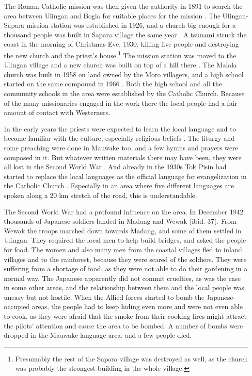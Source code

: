 The Roman Catholic mission was then given the authority in 1891 to search the area between Ulingan and Bogia for suitable places for the mission \citep[8]{Duamba1996}.  The Ulingan-Sapara mission station was established in 1926, and a church big enough for a thousand people was built in Sapara village the same year \citep[21]{BrummEtAl1995}%
.  A tsunami struck the coast in the morning of Christmas Eve, 1930, killing five people and destroying the new church and the priest's house.\footnote{Presumably the rest of the Sapara village was destroyed as well, as the church was probably the strongest building in the whole village.}  The mission station was moved to the Ulingan village and a new church was built on top of a hill there \citep[20--21]{Davies1999}. The Malala church was built in 1958 on land owned by the Moro villagers, and a high school started on the same compound in 1966 \citep[45]{BrummEtAl1995}%
. Both the high school and all the community schools in the area were established by the Catholic Church.  Because of the many missionaries engaged in the work there the local people had a fair amount of contact with Westerners.

In the early years the priests were expected to learn the local language and to become familiar with the culture, especially religious beliefs \citep[25]{BrummEtAl1995}%
. The liturgy and some preaching were done in Mauwake too, and a few hymns and prayers were composed in it. But whatever written materials there may have been, they were all lost in the Second World War \citep[3--4]{ZGraggen1971}.  And already in the 1930s Tok Pisin had started to replace the local languages as the official language for evangelization in the Catholic Church \citep[179]{BrummEtAl1995}%
.  Especially in an area where five different languages are spoken along a 20 km stretch of the road, this is understandable.  

The Second World War had a profound influence on the area.  In December 1942 thousands of Japanese soldiers landed in Madang and Wewak (ibid. 37).  From Wewak the troops marched down towards Madang, and some of them settled in Ulingan.  They required the local men to help build bridges, and asked the people for food.  The women and also many men from the coastal villages fled to inland villages and to the rainforest, because they were scared of the soldiers.  They were suffering from a shortage of food, as they were not able to do their gardening in a normal way.  The Japanese apparently did not commit cruelties, as was the case in some other areas, and the relationship between them and the local people was uneasy but not hostile. When the Allied forces started to bomb the Japanese-occupied areas, the people had to keep hiding even more and were not even able to cook, as they were afraid that the smoke from their cooking fires might attract the pilots' attention and cause the area to be bombed.  A number of bombs were dropped in the Mauwake language area, and a few people died. 

